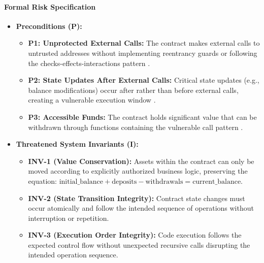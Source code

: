 \paragraph{Formal Risk Specification}

\begin{itemize}
\item \textbf{Preconditions (P):}
    \begin{itemize}
    \item \textbf{P1: Unprotected External Calls:} The contract makes external calls to untrusted addresses without implementing reentrancy guards or following the checks-effects-interactions pattern \cite{perez2021analysis}.
    \item \textbf{P2: State Updates After External Calls:} Critical state updates (e.g., balance modifications) occur after rather than before external calls, creating a vulnerable execution window \cite{praitheeshan2019systematic}.
    \item \textbf{P3: Accessible Funds:} The contract holds significant value that can be withdrawn through functions containing the vulnerable call pattern \cite{zhou2023sok}.
    \end{itemize}

\item \textbf{Threatened System Invariants (I):}
    \begin{itemize}
    \item \textbf{INV-1 (Value Conservation):} Assets within the contract can only be moved according to explicitly authorized business logic, preserving the equation: $\text{initial\_balance} + \text{deposits} - \text{withdrawals} = \text{current\_balance}$.
    \item \textbf{INV-2 (State Transition Integrity):} Contract state changes must occur atomically and follow the intended sequence of operations without interruption or repetition.
    \item \textbf{INV-3 (Execution Order Integrity):} Code execution follows the expected control flow without unexpected recursive calls disrupting the intended operation sequence.
    \end{itemize}


\end{itemize}
